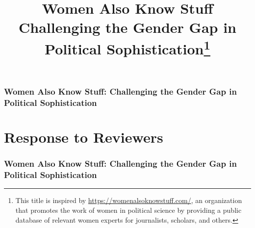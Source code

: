\documentclass[12pt]{article}
\title{Women Also Know Stuff \\
\large{Challenging the Gender Gap in Political Sophistication}\footnote{This title is inspired by \url{https://womenalsoknowstuff.com/}, an organization that promotes the work of women in political science by providing a public database of relevant women experts for journalists, scholars, and others. %
}} %
\date{}
\begin{document}
\maketitle
\doublespacing
\thispagestyle{empty}


\hfill

\hfill

\newpage\setcounter{page}{1}


\clearpage
\singlespacing



\clearpage
\singlespacing
\renewcommand\thesubsection{\Roman{subsection}}
\setcounter{page}{1}
\appendices
\subsubsection*{Women Also Know Stuff: Challenging the Gender Gap in Political Sophistication}
\startcontents[sections]
\thispagestyle{empty}
\clearpage
\newpage\setcounter{page}{1}


\clearpage
\singlespacing
\setcounter{page}{1}
\section*{Response to Reviewers}
\subsubsection*{Women Also Know Stuff: Challenging the Gender Gap in Political Sophistication}
\startcontents[memo]

\end{document}
